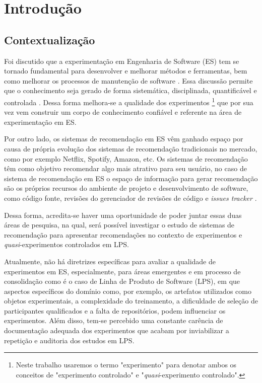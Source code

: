 \chapter{Introdução}
\pagestyle{plain}

\section{Contextualização}

Foi discutido que a experimentação em Engenharia de Software (ES) tem se tornado fundamental para desenvolver e melhorar métodos e ferramentas, bem como melhorar os processos de manutenção de software \cite{kitchenham2007large}. Essa discussão permite que o conhecimento seja gerado de forma sistemática, disciplinada, quantificável e controlada \cite{wohlin2012experimentation}. Dessa forma melhora-se a qualidade dos experimentos \footnote[1]{Neste trabalho usaremos o termo "experimento" para denotar ambos os conceitos de "experimento controlado" e "\textit{quasi}-experimento controlado".} que por sua vez vem construir um corpo de conhecimento confiável e referente na área de experimentação em ES. 

Por outro lado, os sistemas de recomendação em ES vêm ganhado espaço por causa de própria evolução dos sistemas de recomendação tradicionais no mercado, como por exemplo Netflix, Spotify, Amazon, etc. Os sistemas de recomendação têm como objetivo recomendar algo mais atrativo para seu usuário, no caso de sistema de recomendação em ES o espaço de informação para gerar recomendação são os próprios recursos do ambiente de projeto e desenvolvimento de software, como código fonte, revisões do gerenciador de revisões de código e \textit{issues tracker} \cite{robillard2010recommendation}.

Dessa forma, acredita-se haver uma oportunidade de poder juntar essas duas áreas de pesquisa, na qual, será possível investigar o estudo de sistemas de recomendação para apresentar recomendações no contexto de experimentos e \textit{quasi}-experimentos controlados em LPS.

Atualmente, não há diretrizes específicas para avaliar a qualidade de experimentos em ES, especialmente, para áreas emergentes e em processo de consolidação como é o caso de Linha de Produto de Software (LPS), em que aspectos específicos do domínio como, por exemplo, os artefatos utilizados como objetos experimentais, a complexidade do treinamento, a dificuldade de seleção de participantes qualificados e a falta de repositórios, podem influenciar os experimentos. Além disso, tem-se percebido uma constante carência de documentação adequada dos experimentos que acabam por inviabilizar a repetição e auditoria dos estudos em LPS.


